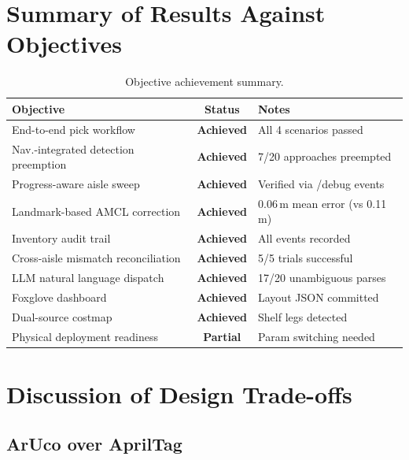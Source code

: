 \documentclass[12pt,a4paper]{report}
\begin{document}
\section{Summary of Results Against Objectives}

\begin{table}[H]
\centering
\caption{Objective achievement summary.}
\label{tab:objectives}
\begin{tabular}{p{7cm} c p{4.5cm}}
\toprule
\textbf{Objective} & \textbf{Status} & \textbf{Notes} \\
\midrule
End-to-end pick workflow & \textcolor{codegreen}{\textbf{Achieved}} & All 4 scenarios passed \\
Nav.-integrated detection preemption & \textcolor{codegreen}{\textbf{Achieved}} & 7/20 approaches preempted \\
Progress-aware aisle sweep & \textcolor{codegreen}{\textbf{Achieved}} & Verified via /debug events \\
Landmark-based AMCL correction & \textcolor{codegreen}{\textbf{Achieved}} & 0.06\,m mean error (vs 0.11\,m) \\
Inventory audit trail & \textcolor{codegreen}{\textbf{Achieved}} & All events recorded \\
Cross-aisle mismatch reconciliation & \textcolor{codegreen}{\textbf{Achieved}} & 5/5 trials successful \\
LLM natural language dispatch & \textcolor{codegreen}{\textbf{Achieved}} & 17/20 unambiguous parses \\
Foxglove dashboard & \textcolor{codegreen}{\textbf{Achieved}} & Layout JSON committed \\
Dual-source costmap & \textcolor{codegreen}{\textbf{Achieved}} & Shelf legs detected \\
Physical deployment readiness & \textcolor{accentorange}{\textbf{Partial}} & Param switching needed \\
\bottomrule
\end{tabular}
\end{table}

\section{Discussion of Design Trade-offs}
\label{sec:tradeoffs}

\subsection{ArUco over AprilTag}
\end{document}
